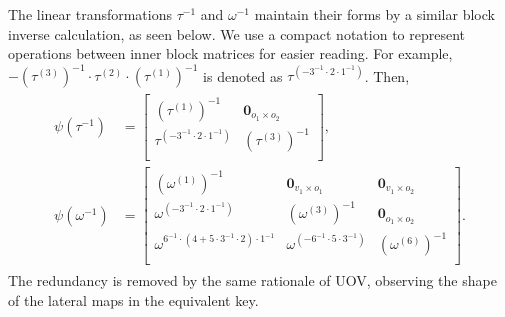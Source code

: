 \documentclass[12pt, a4paper, oneside]{memoir}
\theoremstyle{definition}
\begin{document}
The linear transformations $\tau^{-1}$ and $\omega^{-1}$ maintain their forms by a similar block inverse calculation, as seen below. We use a compact notation to represent operations between inner block matrices for easier reading. For example, $-(\tau^{(3)})^{-1} \cdot \tau^{(2)} \cdot (\tau^{(1)})^{-1}$ is denoted as $\tau^{(-3^{-1} \cdot 2 \cdot 1^{-1})}$. Then,
\begin{align}
  \begin{split}
    \psi(\tau^{-1}) &=
    \begin{bmatrix}
      (\tau^{(1)})^{-1} & \mathbf{0}_{o_{1} \times o_{2}} \\
      \tau^{(-3^{-1} \cdot 2 \cdot 1^{-1})} & (\tau^{(3)})^{-1} \\
    \end{bmatrix}, \\
    \psi(\omega^{-1}) &=
    \begin{bmatrix}
      (\omega^{(1)})^{-1} & \mathbf{0}_{v_{1} \times o_{1}} & \mathbf{0}_{v_{1} \times o_{2}} \\
      \omega^{(-3^{-1} \cdot 2 \cdot 1^{-1})} & (\omega^{(3)})^{-1} & \mathbf{0}_{o_{1} \times o_{2}} \\
      \omega^{6^{-1} \cdot (4 + 5 \cdot 3^{-1} \cdot 2) \cdot 1^{-1}}
      & \omega^{(-6^{-1} \cdot 5 \cdot 3^{-1})} & (\omega^{(6)})^{-1} \\
    \end{bmatrix}.
  \end{split}
\end{align}
The redundancy is removed by the same rationale of UOV, observing the shape of the lateral maps in the equivalent key.
\end{document}
